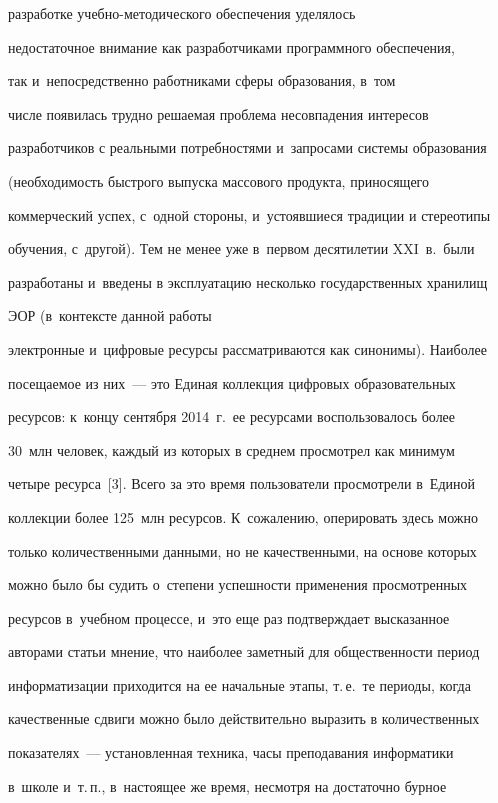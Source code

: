 разработке учеб\-но-ме\-то\-ди\-че\-ско\-го обеспечения уделялось


недостаточное внимание как разработчиками программного обеспечения, 


так и~непосредственно работниками сферы образования, в~том


чис\-ле появилась трудно решаемая проблема несовпадения интересов


разработчиков с реальными потребностями и~запросами системы образования


(необходимость быстрого выпуска массового продукта, приносящего


коммерческий успех, с~одной стороны, и~устоявшиеся традиции и стереотипы


обучения, с~другой). Тем не менее уже в~первом десятилетии XXI~в.\ были


разработаны и~введены в эксплуатацию несколько государственных хранилищ


ЭОР (в~контексте данной работы


электронные и~цифровые ресурсы рассматриваются как синонимы). Наиболее


посещаемое из них~--- это Единая коллекция цифровых образовательных


ресурсов: к~концу сентября 2014~г.\ ее ресурсами воспользовалось более


30~млн человек, каждый из которых в среднем просмотрел как минимум


четыре ресурса~[3]. Всего за это время пользователи просмотрели в~Единой


коллекции более 125~млн ресурсов. К~сожалению, оперировать здесь можно


только количественными данными, но не качественными, на основе которых


можно было бы судить о~степени успешности применения просмотренных


ресурсов в~учебном процессе, и~это еще раз подтверждает высказанное


авторами статьи мнение, что наиболее заметный для общественности период


информатизации приходится на ее начальные этапы, т.\,е.\ те периоды, когда


качественные сдвиги можно было действительно выразить в количественных


показателях~--- установленная техника, часы преподавания информатики


в~школе и~т.\,п., в~настоящее же время, несмотря на достаточно бурное


